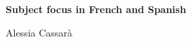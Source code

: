\begin{titlepage}
   \begin{center}
       \vspace*{1cm}

       {\huge
            \textbf{Subject focus in French and Spanish}
       }
  
  
    {\Large
            Alessia Cassarà\\
       }
  
    
            
   \end{center}
\end{titlepage}